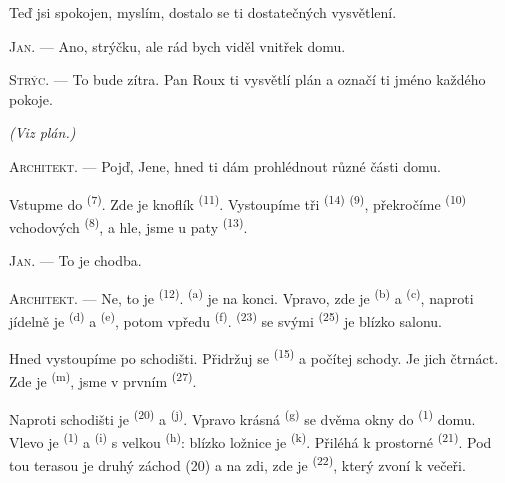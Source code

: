 Teď jsi spokojen, myslím, dostalo se ti dostatečných vysvětlení.

\textsc{Jan}. --- Ano, strýčku, ale rád bych viděl vnitřek domu.

\textsc{Strýc}. --- To bude zítra. Pan Roux ti vysvětlí plán a označí ti jméno každého
pokoje.

\VUsaut{3.0mm}
\VUsaut{2.4mm}

{\centering\textit{(Viz plán.)}\par}
\VUsaut{2.4mm}

\textsc{Architekt}. --- Pojď, Jene, hned ti dám prohlédnout různé části domu.

Vstupme do  \textsuperscript{(7)}. Zde je knoflík 
\textsuperscript{(11)}. Vystoupíme tři  \textsuperscript{(14)}
 \textsuperscript{(9)}, překročíme 
\textsuperscript{(10)} vchodových  \textsuperscript{(8)}, a hle, jsme u
paty  \textsuperscript{(13)}.

\textsc{Jan}. --- To je chodba.

\textsc{Architekt}. --- Ne, to je  \textsuperscript{(12)}.
 \textsuperscript{(a)} je na konci. Vpravo, zde je 
\textsuperscript{(b)} a  \textsuperscript{(c)}, naproti jídelně je
 \textsuperscript{(d)} a 
\textsuperscript{(e)}, potom vpředu  \textsuperscript{(f)}.
 \textsuperscript{(23)} se svými 
\textsuperscript{(25)} je blízko salonu.

Hned vystoupíme po schodišti. Přidržuj se  \textsuperscript{(15)} a
počítej schody. Je jich čtrnáct. Zde je  \textsuperscript{(m)},
jsme v prvním  \textsuperscript{(27)}.

\VUsaut{3.0mm}
\VUsaut{3.0mm}

Naproti schodišti je  \textsuperscript{(20)} a 
\textsuperscript{(j)}. Vpravo krásná  \textsuperscript{(g)} se dvěma
okny do  \textsuperscript{(1)} domu. Vlevo je 
\textsuperscript{(1)} a  \textsuperscript{(i)} s velkou
 \textsuperscript{(h)}: blízko ložnice je 
\textsuperscript{(k)}. Přiléhá k prostorné  \textsuperscript{(21)}. Pod
tou terasou je druhý záchod (20) a na zdi, zde je 
\textsuperscript{(22)}, který zvoní k večeři.

